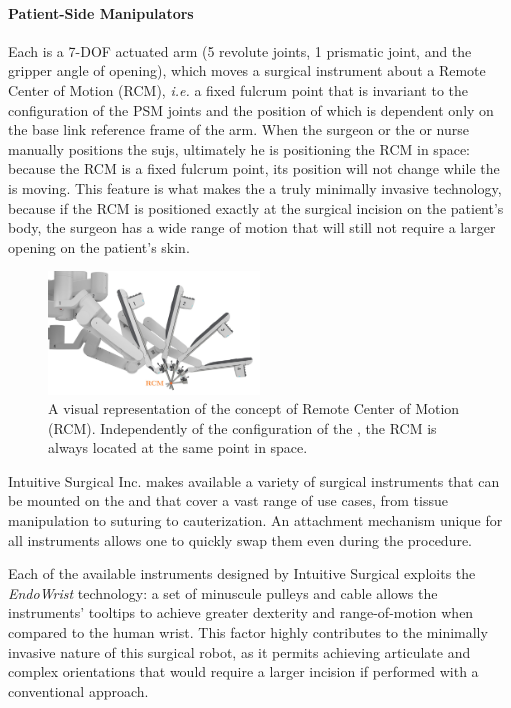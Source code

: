 \documentclass[../main.tex]{subfiles}
\begin{document}
\paragraph{Patient-Side Manipulators} Each \psm is a 7-DOF actuated arm (5 revolute joints, 1 prismatic joint, and the gripper angle of opening), which moves a surgical instrument about a Remote Center of Motion (RCM), \textit{i.e.} a fixed fulcrum point that is invariant to the configuration of the PSM joints and the position of which is dependent only on the base link reference frame of the arm. When the surgeon or the \ac{or} nurse manually positions the \acp{suj}, ultimately he is positioning the RCM in space: because the RCM is a fixed fulcrum point, its position will not change while the \psm is moving. This feature is what makes the \davinci a truly minimally invasive technology, because if the RCM is positioned exactly at the surgical incision on the patient's body, the surgeon has a wide range of motion that will still not require a larger opening on the patient's skin. 

\begin{figure}[h!]
    \centering
    \includegraphics[width=0.5\textwidth]{images/rcm.jpg}
    \caption{A visual representation of the concept of Remote Center of Motion (RCM). Independently of the configuration of the \psm, the RCM is always located at the same point in space.}
    \label{fig:rcm}
\end{figure}

Intuitive Surgical Inc. makes available a variety of surgical instruments that can be mounted on the \psms and that cover a vast range of use cases, from tissue manipulation to suturing to cauterization. An attachment mechanism unique for all instruments allows one to quickly swap them even during the procedure.

Each of the available instruments designed by Intuitive Surgical exploits the \textit{EndoWrist}\cright\xspace technology: a set of minuscule pulleys and cable allows the instruments' tooltips to achieve greater dexterity and range-of-motion when compared to the human wrist. This factor highly contributes to the minimally invasive nature of this surgical robot, as it permits achieving articulate and complex orientations that would require a larger incision if performed with a conventional approach.
\end{document}
